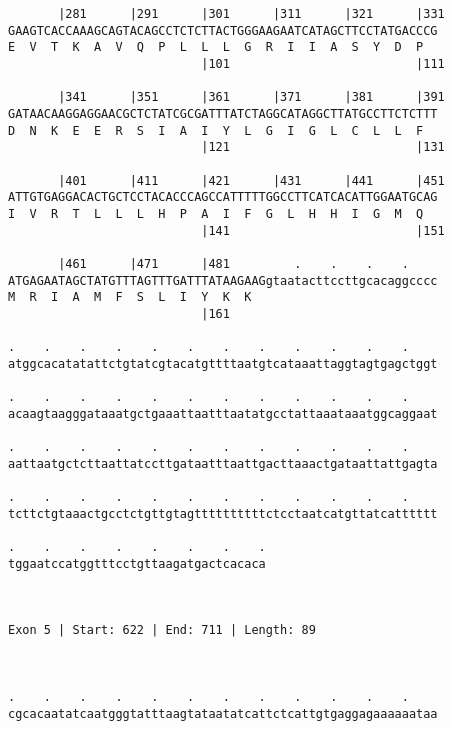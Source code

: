 \documentclass{article}
\begin{document}
\begin{Verbatim}
       |281      |291      |301      |311      |321      |331
GAAGTCACCAAAGCAGTACAGCCTCTCTTACTGGGAAGAATCATAGCTTCCTATGACCCG
E  V  T  K  A  V  Q  P  L  L  L  G  R  I  I  A  S  Y  D  P  
                           |101                          |111
  
       |341      |351      |361      |371      |381      |391
GATAACAAGGAGGAACGCTCTATCGCGATTTATCTAGGCATAGGCTTATGCCTTCTCTTT
D  N  K  E  E  R  S  I  A  I  Y  L  G  I  G  L  C  L  L  F  
                           |121                          |131
  
       |401      |411      |421      |431      |441      |451
ATTGTGAGGACACTGCTCCTACACCCAGCCATTTTTGGCCTTCATCACATTGGAATGCAG
I  V  R  T  L  L  L  H  P  A  I  F  G  L  H  H  I  G  M  Q  
                           |141                          |151
  
       |461      |471      |481         .    .    .    .    
ATGAGAATAGCTATGTTTAGTTTGATTTATAAGAAGgtaatacttccttgcacaggcccc
M  R  I  A  M  F  S  L  I  Y  K  K                          
                           |161                             
  
.    .    .    .    .    .    .    .    .    .    .    .    
atggcacatatattctgtatcgtacatgttttaatgtcataaattaggtagtgagctggt
                                                            
.    .    .    .    .    .    .    .    .    .    .    .    
acaagtaagggataaatgctgaaattaatttaatatgcctattaaataaatggcaggaat
                                                            
.    .    .    .    .    .    .    .    .    .    .    .    
aattaatgctcttaattatccttgataatttaattgacttaaactgataattattgagta
                                                            
.    .    .    .    .    .    .    .    .    .    .    .    
tcttctgtaaactgcctctgttgtagttttttttttctcctaatcatgttatcatttttt
                                                            
.    .    .    .    .    .    .    .
tggaatccatggtttcctgttaagatgactcacaca
                                    
                                    
 
Exon 5 | Start: 622 | End: 711 | Length: 89



.    .    .    .    .    .    .    .    .    .    .    .    
cgcacaatatcaatgggtatttaagtataatatcattctcattgtgaggagaaaaaataa
                                                            

\end{Verbatim}
\end{document}
